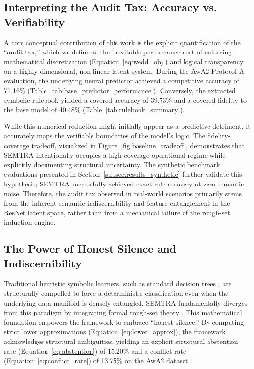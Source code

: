 \documentclass[make,article,submit,pdftex,moreauthors]{Definitions/mdpi}
\begin{document}
\subsection{Interpreting the Audit Tax: Accuracy vs. Verifiability}
\label{subsec:interpreting_tax}

A core conceptual contribution of this work is the explicit quantification of the ``audit tax,'' which we define as the inevitable performance cost of enforcing mathematical discretization (Equation~\eqref{eq:wedd_obj}) and logical transparency on a highly dimensional, non-linear latent system. During the AwA2 Protocol A evaluation, the underlying neural predictor achieved a competitive accuracy of 71.16\% (Table~\ref{tab:base_predictor_performance}). Conversely, the extracted symbolic rulebook yielded a covered accuracy of 39.73\% and a covered fidelity to the base model of 40.48\% (Table~\ref{tab:rulebook_summary}). 

While this numerical reduction might initially appear as a predictive detriment, it accurately maps the verifiable boundaries of the model's logic. The fidelity-coverage tradeoff, visualized in Figure~\ref{fig:baseline_tradeoff}, demonstrates that SEMTRA intentionally occupies a high-coverage operational regime while explicitly documenting structural uncertainty. The synthetic benchmark evaluations presented in Section~\ref{subsec:results_synthetic} further validate this hypothesis; SEMTRA successfully achieved exact rule recovery at zero semantic noise. Therefore, the audit tax observed in real-world scenarios primarily stems from the inherent semantic indiscernibility and feature entanglement in the ResNet latent space, rather than from a mechanical failure of the rough-set induction engine.

\subsection{The Power of Honest Silence and Indiscernibility}
\label{subsec:honest_silence}

Traditional heuristic symbolic learners, such as standard decision trees \cite{Mienye2024DecisionTrees}, are structurally compelled to force a deterministic classification even when the underlying data manifold is densely entangled. SEMTRA fundamentally diverges from this paradigm by integrating formal rough-set theory \cite{Pawlak1982RoughSets, Pawlak1991RoughSets}. This mathematical foundation empowers the framework to embrace ``honest silence.'' By computing strict lower approximations (Equation~\eqref{eq:lower_approx}), the framework acknowledges structural ambiguities, yielding an explicit structural abstention rate (Equation~\eqref{eq:abstention}) of 15.20\% and a conflict rate (Equation~\eqref{eq:conflict_rate}) of 13.75\% on the AwA2 dataset. 
\end{document}
